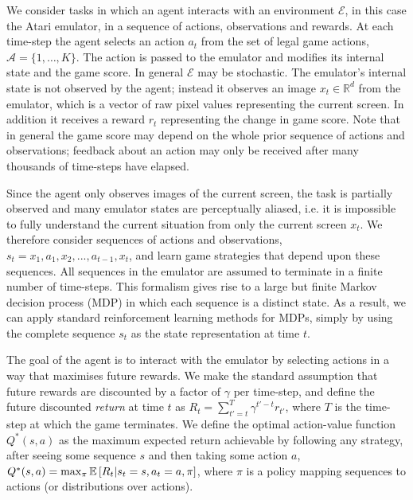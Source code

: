 
We consider tasks in which an agent interacts with an environment $\mathcal{E}$, in this case the Atari emulator, in a sequence of actions, observations and rewards. 
At each time-step the agent selects an action $a_t$ from the set of legal game actions, $\mathcal{A}=\{1, \ldots, K \}$. The action is passed to the emulator and modifies its internal state and the game score. In general $\mathcal{E}$ may be stochastic. The emulator's internal state is not observed by the agent; instead it observes an image $x_t \in \mathbb{R}^d$ from the emulator, which is a vector of raw pixel values representing the current screen. In addition it receives a reward $r_t$ representing the change in game score. Note that in general the game score may depend on the whole prior sequence of actions and observations; feedback about an action may only be received after many thousands of time-steps have elapsed. 

Since the agent only observes images of the current screen, the task is partially observed and many emulator states are perceptually aliased, i.e. it is impossible to fully understand the current situation from only the current screen $x_t$. We therefore consider sequences of actions and observations, $s_t = {x_1, a_1, x_2, ..., a_{t-1}, x_t}$, and learn game strategies that depend upon these sequences. All sequences in the emulator are assumed to terminate in a finite number of time-steps. This formalism gives rise to a large but finite Markov decision process (MDP) in which each sequence is a distinct state. As a result, we can apply standard reinforcement learning methods for MDPs, simply by using the complete sequence $s_t$ as the state representation at time $t$.

The goal of the agent is to interact with the emulator by selecting actions in a way that maximises future rewards. We make the standard assumption that future rewards are discounted by a factor of $\gamma$ per time-step, and define the future discounted \emph{return} at time $t$ as $R_t = \sum_{t'=t}^{T} \gamma^{t'-t} r_{t'}$, where $T$
is the time-step at which the game terminates. We define the optimal action-value function $Q^*(s,a)$ as the maximum expected return achievable by following any strategy, after seeing some sequence $s$ and then taking some action $a$, $Q^*(s,a) = \max_{\pi} \mathbb{E} \left[  R_t | s_t=s, a_t=a, \pi  \right]$, where $\pi$ is a policy mapping sequences to actions (or distributions over actions).

